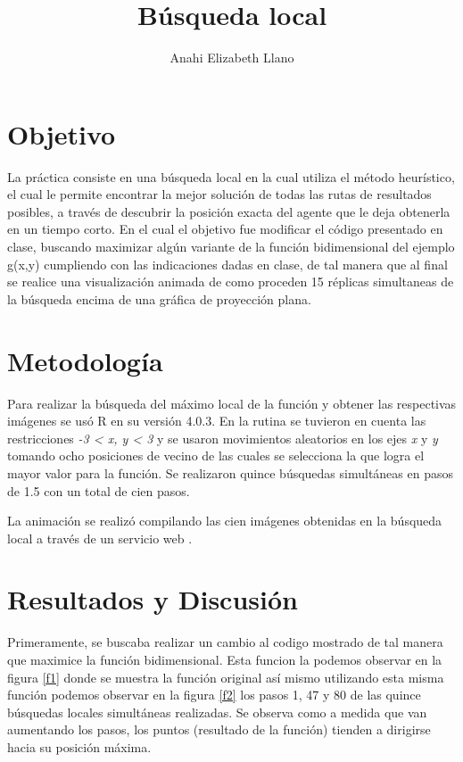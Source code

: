 \documentclass{article}
\begin{document}
\title{\textbf{B\'usqueda local}}
\author{Anahi Elizabeth Llano}

\maketitle

\section{Objetivo}\label{obj}

La pr\'actica consiste en una b\'usqueda local \cite{elisa} en la cual utiliza el m\'etodo heur\'istico, el cual le permite encontrar la mejor soluci\'on de todas las rutas de resultados posibles, a trav\'es de descubrir la posici\'on exacta del agente que le deja obtenerla en un tiempo corto.
En el cual el objetivo fue modificar el c\'odigo presentado en clase, buscando maximizar alg\'un variante de la funci\'on bidimensional del ejemplo g(x,y) cumpliendo con las indicaciones dadas en clase, de tal manera que al final se realice una visualizaci\'on animada de como proceden 15 r\'eplicas simultaneas de la b\'usqueda encima de una gr\'afica de proyecci\'on plana.

\section{Metodolog\'{i}a}\label{met}

Para realizar la b\'usqueda del m\'aximo local de la funci\'on y obtener las respectivas im\'agenes se us\'o R en su versi\'on 4.0.3.
En la rutina se tuvieron en cuenta las restricciones \textit{-3 < x, y < 3} y se usaron movimientos aleatorios en los ejes \textit{x} y \textit{y} tomando ocho posiciones de vecino de las cuales se selecciona la que logra el mayor valor para la funci\'on.  Se realizaron quince b\'usquedas simult\'aneas en pasos de 1.5 con un total de cien pasos.

La animaci\'on se realiz\'o compilando las cien im\'agenes obtenidas en la b\'usqueda local a trav\'es de un servicio web \citep{inter}.

\section{Resultados y Discusi\'{o}n}\label{res}

Primeramente, se buscaba realizar un cambio al codigo \citep{elisa} mostrado de tal manera que maximice la funci\'on bidimensional. Esta funcion la podemos observar en la figura \ref{f1} donde se muestra la funci\'on original as\'i mismo utilizando esta misma funci\'on podemos observar en la figura \ref{f2} los pasos 1, 47 y 80 de las quince b\'usquedas locales simult\'aneas realizadas.  Se observa como a medida que van aumentando los pasos, los puntos (resultado de la funci\'on) tienden a dirigirse hacia su posici\'on m\'axima. 
\end{document}
